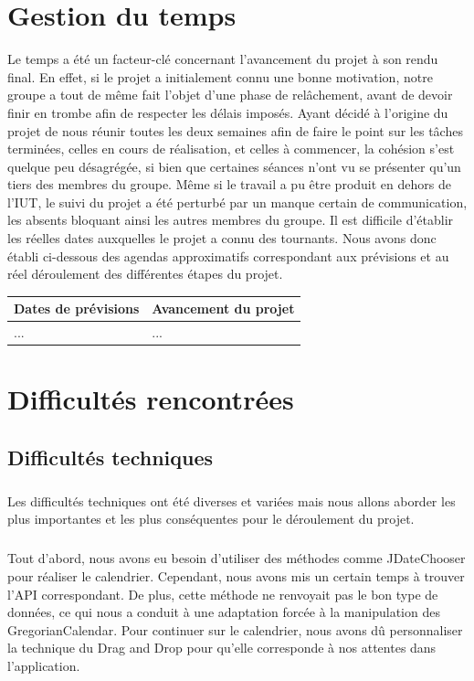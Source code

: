 \documentclass[a4paper,10pt]{report}
\begin{document}
      
  \chapter{Gestion du temps}
    Le temps a été un facteur-clé concernant l'avancement du projet à son rendu final.
    En effet, si le projet a initialement connu une bonne motivation, notre groupe a tout de même fait l'objet d'une phase de relâchement, avant de devoir finir en trombe afin de respecter les délais imposés.
    Ayant décidé à l'origine du projet de nous réunir toutes les deux semaines afin de faire le point sur les tâches terminées, celles en cours de réalisation, et celles à commencer, la cohésion s'est quelque peu désagrégée, si bien que certaines séances n'ont vu se présenter qu'un tiers des membres du groupe.
    Même si le travail a pu être produit en dehors de l'IUT, le suivi du projet a été perturbé par un manque certain de communication, les absents bloquant ainsi les autres membres du groupe.
    Il est difficile d'établir les réelles dates auxquelles le projet a connu des tournants.
    Nous avons donc établi ci-dessous des agendas approximatifs correspondant aux prévisions et au réel déroulement des différentes étapes du projet.
    
    
    \begin{tabular}{|l|l|}
      \hline
	Dates de prévisions & Avancement du projet\\
      \hline
	... & ...\\
      \hline
    \end{tabular}

    

    
    
  \chapter{Difficultés rencontrées}
    \section{Difficultés techniques}
      \paragraph{}
	Les difficultés techniques ont été diverses et variées mais nous allons aborder les plus importantes et les plus conséquentes pour le déroulement du projet.
      
      \paragraph{}
	Tout d'abord, nous avons eu besoin d'utiliser des méthodes comme JDateChooser pour réaliser le calendrier. Cependant, nous avons mis un certain temps à trouver l'API correspondant.
	De plus, cette méthode ne renvoyait pas le bon type de données, ce qui nous a conduit à une adaptation forcée à la manipulation des GregorianCalendar.
	Pour continuer sur le calendrier, nous avons dû personnaliser la technique du Drag and Drop pour qu'elle corresponde à nos attentes dans l'application.
	
\end{document}
